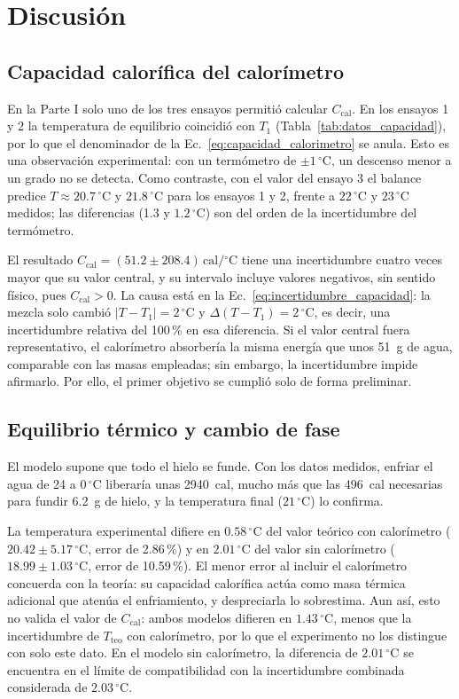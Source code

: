 \section{Discusión}

\subsection{Capacidad calorífica del calorímetro}
En la Parte I solo uno de los tres ensayos permitió
calcular $C_{\mathrm{cal}}$. En los ensayos 1 y 2 la temperatura
de equilibrio coincidió con $T_1$ (Tabla~\ref{tab:datos_capacidad}), por lo que el
denominador de la Ec.~\eqref{eq:capacidad_calorimetro} se anula. Esto es una
observación experimental: con un termómetro de
$\pm 1\,^{\circ}$C, un descenso menor a un grado no se
detecta. Como contraste, con el valor del ensayo 3 el
balance predice $T\approx 20.7\,^{\circ}$C y
$21.8\,^{\circ}$C para los ensayos 1 y 2, frente a
$22\,^{\circ}$C y $23\,^{\circ}$C medidos; las diferencias
(1.3 y $1.2\,^{\circ}$C) son del orden de la incertidumbre
del termómetro.

El resultado
$C_{\mathrm{cal}}=(51.2\pm208.4)\,\mathrm{cal/{}^{\circ}C}$
tiene una incertidumbre cuatro veces mayor que su valor
central, y su intervalo incluye valores negativos, sin
sentido físico, pues $C_{\mathrm{cal}}>0$. La causa está en la
Ec.~\eqref{eq:incertidumbre_capacidad}: la mezcla solo cambió $|T-T_1|=2\,^{\circ}$C y
$\Delta(T-T_1)=2\,^{\circ}$C, es decir, una incertidumbre
relativa del 100\,\% en esa diferencia. Si el valor central
fuera representativo, el calorímetro absorbería la misma
energía que unos 51~g de agua, comparable con las masas
empleadas; sin embargo, la incertidumbre impide afirmarlo.
Por ello, el primer objetivo se cumplió solo de forma
preliminar.

\subsection{Equilibrio térmico y cambio de fase}
El modelo supone que todo el hielo se funde. Con los datos
medidos, enfriar el agua de 24 a $0\,^{\circ}$C liberaría
unas 2940~cal, mucho más que las 496~cal necesarias para
fundir 6.2~g de hielo, y la temperatura final
($21\,^{\circ}$C) lo confirma.

La temperatura experimental difiere en $0.58\,^{\circ}$C
del valor teórico con calorímetro
($20.42\pm5.17\,^{\circ}$C, error de 2.86\,\%) y en
$2.01\,^{\circ}$C del valor sin calorímetro
($18.99\pm1.03\,^{\circ}$C, error de 10.59\,\%). El menor
error al incluir el calorímetro concuerda con la teoría:
su capacidad calorífica actúa como masa térmica adicional
que atenúa el enfriamiento, y despreciarla lo sobrestima.
Aun así, esto no valida el valor de $C_{\mathrm{cal}}$: ambos
modelos difieren en $1.43\,^{\circ}$C, menos que la
incertidumbre de $T_{\mathrm{teo}}$ con calorímetro, por lo que el
experimento no los distingue con solo este dato. En el modelo sin
calorímetro, la diferencia de $2.01\,{}^{\circ}\mathrm{C}$ se encuentra
en el límite de compatibilidad con la incertidumbre combinada
considerada de $2.03\,{}^{\circ}\mathrm{C}$.

